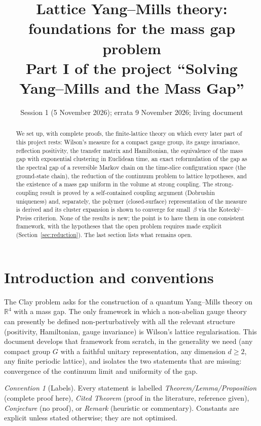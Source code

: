 \documentclass[11pt,a4paper]{article}
\title{Lattice Yang--Mills theory: foundations for the mass gap problem\\
\large Part I of the project ``Solving Yang--Mills and the Mass Gap''}
\author{}
\date{Session 1 (5 November 2026); errata 9 November 2026; living document}
\theoremstyle{definition}
\theoremstyle{remark}
\newtheorem{convention}[theorem]{Convention}
\newcommand{\R}{\mathbb{R}}
\begin{document}
\maketitle

\begin{abstract}
We set up, with complete proofs, the finite-lattice theory on which every later part of this project
rests: Wilson's measure for a compact gauge group, its gauge invariance, reflection positivity, the
transfer matrix and Hamiltonian, the equivalence of the mass gap with exponential clustering in
Euclidean time, an exact reformulation of the gap as the spectral gap of a reversible Markov chain on
the time-slice configuration space (the ground-state chain), the reduction of the continuum problem to
lattice hypotheses, and the existence of a mass gap uniform in the volume at strong coupling. The
strong-coupling result is proved by a self-contained coupling argument (Dobrushin uniqueness) and,
separately, the polymer (closed-surface) representation of the measure is derived and its cluster
expansion is shown to converge for small~$\beta$ via the Kotecký--Preiss criterion. None of the results
is new; the point is to have them in one consistent framework, with the hypotheses that the open
problem requires made explicit (Section~\ref{sec:reduction}). The last section lists what remains open.
\end{abstract}

\tableofcontents

\section{Introduction and conventions}

The Clay problem asks for the construction of a quantum Yang--Mills theory on $\R^4$ with a mass gap.
The only framework in which a non-abelian gauge theory can presently be defined non-perturbatively with
all the relevant structure (positivity, Hamiltonian, gauge invariance) is Wilson's lattice regularisation.
This document develops that framework from scratch, in the generality we need (any compact group $G$ with
a faithful unitary representation, any dimension $d\ge2$, any finite periodic lattice), and isolates the
two statements that are missing: convergence of the continuum limit and uniformity of the gap.

\begin{convention}[Labels]
Every statement is labelled \emph{Theorem/Lemma/Proposition} (complete proof here), \emph{Cited Theorem}
(proof in the literature, reference given), \emph{Conjecture} (no proof), or \emph{Remark} (heuristic
or commentary). Constants are explicit unless stated otherwise; they are not optimised.
\end{convention}
\end{document}

